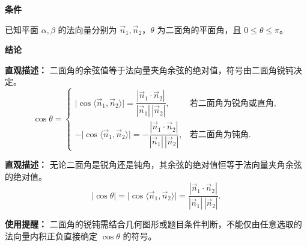 \begin{statementbox}
	\textbf{\textcolor{CStatement}{条件}}
	\begin{description}[style=nextline, leftmargin=2.8em, labelsep=0.5em, itemsep=0.35em]
		\item[\textbf{\textcolor{CStatement}{条件 1（法向量与角）：}}]
		      已知平面 $\alpha,\beta$ 的法向量分别为 $\vec{n}_1,\vec{n}_2$，$\theta$ 为二面角的平面角，且 $0\le\theta\le\pi$。
	\end{description}

	\medskip
	\textbf{\textcolor{CStatement}{结论}}
	\begin{description}[style=nextline, leftmargin=2.8em, labelsep=0.5em, itemsep=0.45em]
		\item[\textbf{\textcolor{CStatement}{结论一（分段公式）：}}]
		      \textbf{\textcolor{CStatement}{直观描述：}}
		      二面角的余弦值等于法向量夹角余弦的绝对值，符号由二面角锐钝决定。
		      \[
			      \cos\theta =
			      \begin{cases}
				      \bigl|\cos\langle\vec{n}_1,\vec{n}_2\rangle\bigr|
				      = \dfrac{|\vec{n}_1\cdot\vec{n}_2|}{|\vec{n}_1|\,|\vec{n}_2|},  & \text{若二面角为锐角或直角}, \\[0.8em]
				      -\bigl|\cos\langle\vec{n}_1,\vec{n}_2\rangle\bigr|
				      = -\dfrac{|\vec{n}_1\cdot\vec{n}_2|}{|\vec{n}_1|\,|\vec{n}_2|}, & \text{若二面角为钝角}.
			      \end{cases}
		      \]

		\item[\textbf{\textcolor{CStatement}{推广结论（绝对值式）：}}]
		      \textbf{\textcolor{CStatement}{直观描述：}}
		      无论二面角是锐角还是钝角，其余弦的绝对值恒等于法向量夹角余弦的绝对值。
		      \[
			      |\cos\theta|
			      = \bigl|\cos\langle\vec{n}_1,\vec{n}_2\rangle\bigr|
			      = \dfrac{|\vec{n}_1\cdot\vec{n}_2|}{|\vec{n}_1|\,|\vec{n}_2|}.
		      \]
	\end{description}

	\medskip
	\textbf{\textcolor{CStatement}{使用提醒：}}
	二面角的锐钝需结合几何图形或题目条件判断，不能仅由任意选取的法向量内积正负直接确定 $\cos\theta$ 的符号。
\end{statementbox}